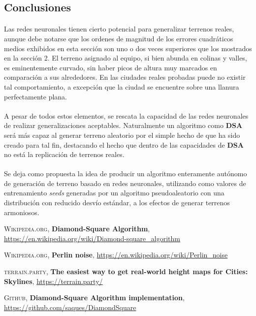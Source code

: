 \documentclass[12pt, twocolumn]{article}
\begin{document}
	\subsection{Conclusiones}
	
	\paragraph{} Las redes neuronales tienen cierto potencial para generalizar terrenos reales, aunque debe notarse que los ordenes de magnitud de los errores cuadráticos medios exhibidos en esta sección son uno o dos veces superiores que los mostrados en la sección 2. El terreno asignado al equipo, si bien abunda en colinas y valles, es eminentemente curvado, sin haber picos de altura muy marcados en comparación a sus alrededores. En las ciudades reales probadas puede no existir tal comportamiento, a excepción que la ciudad se encuentre sobre una llanura perfectamente plana. 
	
	\paragraph{} A pesar de todos estos elementos, se rescata la capacidad de las redes neuronales de realizar generalizaciones aceptables. Naturalmente un algoritmo como \textbf{DSA} será más capaz al generar terreno aleatorio por el simple hecho de que ha sido creado para tal fin, destacando el hecho que dentro de las capacidades de \textbf{DSA} no está la replicación de terrenos reales. 
	
	\paragraph{} Se deja como propuesta la idea de producir un algoritmo enteramente autónomo de generación de terreno basado en redes neuronales, utilizando como valores de entrenamiento \textit{seeds} generadas por un algoritmo pseudoaleatorio con una distribución con reducido desvío estándar, a los efectos de generar terrenos armoniosos.
	
	
	
	
	
	\newpage
	
	\begin{thebibliography}{9}
		
		\textsc{Wikipedia.org}, \textbf{Diamond-Square Algorithm},
		\url{https://en.wikipedia.org/wiki/Diamond-square_algorithm}
		
		\textsc{Wikipedia.org}, \textbf{Perlin noise},
		\url{https://en.wikipedia.org/wiki/Perlin_noise}
		
		\textsc{terrain.party}, \textbf{The easiest way to get real-world height maps for Cities: Skylines},
		\url{https://terrain.party/}
		
		\textsc{Github}, \textbf{Diamond-Square Algorithm implementation},
		\url{https://github.com/saques/DiamondSquare}
		
	\end{thebibliography}

	
	
	
	
	
	
\end{document}
